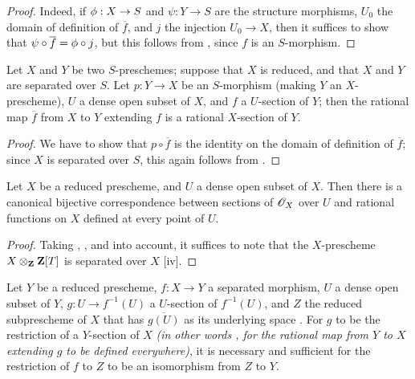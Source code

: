 \begin{proof}
Indeed, if $\vphi:X\to S$ and $\psi:Y\to S$ are the structure morphisms, $U_0$ the domain of definition of $\overline{f}$, and $j$ the injection $U_0\to X$, then it suffices to show that $\psi\circ\overline{f}=\phi\circ j$, but this follows from , since $f$ is an $S$-morphism.
\end{proof}

\begin{corollary}[7.2.5]
\label{I.7.2.5}
Let $X$ and $Y$ be two $S$-preschemes; suppose that $X$ is reduced, and that $X$ and $Y$ are separated over $S$.
Let $p:Y\to X$ be an $S$-morphism (making $Y$ an $X$-prescheme), $U$ a dense open subset of $X$, and $f$ a $U$-section of $Y$; then the rational map $\overline{f}$ from $X$ to $Y$ extending $f$ is a rational $X$-section of $Y$.
\end{corollary}

\begin{proof}
We
have to show that $p\circ\overline{f}$ is the identity on the domain of definition of $\overline{f}$; since $X$ is separated over $S$, this again follows from .
\end{proof}

\begin{corollary}[7.2.6]
\label{I.7.2.6}
Let $X$ be a reduced prescheme, and $U$ a dense open subset of $X$.
Then there is a canonical bijective correspondence between sections of $\mathscr{O}_X$ over $U$ and rational functions on $X$ defined at every point of $U$.
\end{corollary}

\begin{proof}
Taking , , and  into account, it suffices to note that the $X$-prescheme $X\otimes_{\mathbf{Z}}\mathbf{Z}[T]$ is separated over $X$ [iv].
\end{proof}

\begin{corollary}[7.2.7]
\label{I.7.2.7}
Let $Y$ be a reduced prescheme, $f:X\to Y$ a separated morphism, $U$ a dense open subset of $Y$, $g:U\to f^{-1}(U)$ a $U$-section of $f^{-1}(U)$, and $Z$ the reduced subprescheme of $X$ that has $\overline{g(U)}$ as its underlying space .
For $g$ to be the restriction of a $Y$-section of $X$ \emph{(in other words , for the rational map from $Y$ to $X$ extending $g$ to be defined everywhere)}, it is necessary and sufficient for the restriction of $f$ to $Z$ to be an isomorphism from $Z$ to $Y$.
\end{corollary}

